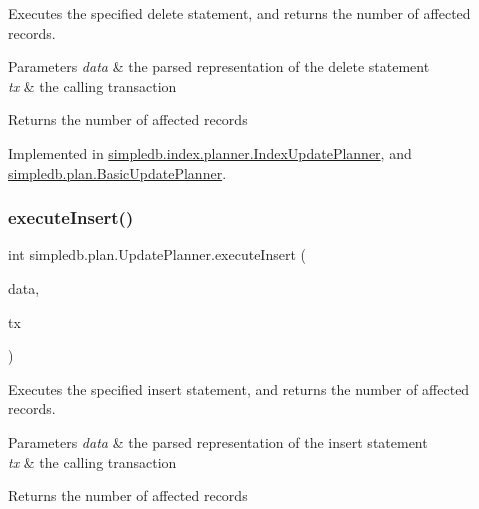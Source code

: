 Executes the specified delete statement, and returns the number of affected records. 
\begin{DoxyParams}{Parameters}
{\em data} & the parsed representation of the delete statement \\
\hline
{\em tx} & the calling transaction \\
\hline
\end{DoxyParams}
\begin{DoxyReturn}{Returns}
the number of affected records 
\end{DoxyReturn}


Implemented in \hyperlink{classsimpledb_1_1index_1_1planner_1_1IndexUpdatePlanner_abc99996e4228128a9ce3a1588a35722a}{simpledb.\+index.\+planner.\+Index\+Update\+Planner}, and \hyperlink{classsimpledb_1_1plan_1_1BasicUpdatePlanner_ae6881ef6bd8ea00c07dd66ee8153bfb9}{simpledb.\+plan.\+Basic\+Update\+Planner}.

\mbox{\label{interfacesimpledb_1_1plan_1_1UpdatePlanner_a6f2cfe8428b2c5f61204b8606905100e}} 
\subsubsection{\texorpdfstring{execute\+Insert()}{executeInsert()}}
{\footnotesize\ttfamily int simpledb.\+plan.\+Update\+Planner.\+execute\+Insert (\begin{DoxyParamCaption}\item[{\hyperlink{classsimpledb_1_1parse_1_1InsertData}{Insert\+Data}}]{data,  }\item[{\hyperlink{classsimpledb_1_1tx_1_1Transaction}{Transaction}}]{tx }\end{DoxyParamCaption})}

Executes the specified insert statement, and returns the number of affected records. 
\begin{DoxyParams}{Parameters}
{\em data} & the parsed representation of the insert statement \\
\hline
{\em tx} & the calling transaction \\
\hline
\end{DoxyParams}
\begin{DoxyReturn}{Returns}
the number of affected records 
\end{DoxyReturn}


